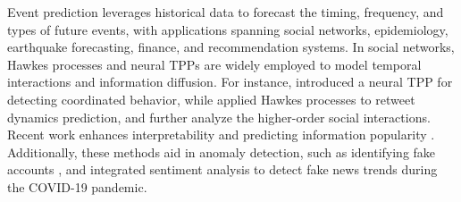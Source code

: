 \documentclass[10pt]{article} %
\begin{document}
Event prediction leverages historical data to forecast the timing, frequency, and types of future events, with applications spanning social networks, epidemiology, earthquake forecasting, finance, and recommendation systems.  
In social networks, Hawkes processes and neural TPPs are widely employed to model temporal interactions and information diffusion. For instance, \citet{zhang2021vigdet} introduced a neural TPP for detecting coordinated behavior, while \citet{kobayashi2016tideh,hegde2022framework} applied Hawkes processes to retweet dynamics prediction, and \citet{cencetti2021temporal} further analyze the higher-order social interactions. Recent work enhances interpretability \citep{meng2024interpretable} and predicting information popularity \citep{li2025public}. Additionally, these methods aid in anomaly detection, such as identifying fake accounts \citep{qu2022mush}, and \citet{ahammad2024identifying} integrated sentiment analysis to detect fake news trends during the COVID-19 pandemic. 
\end{document}
